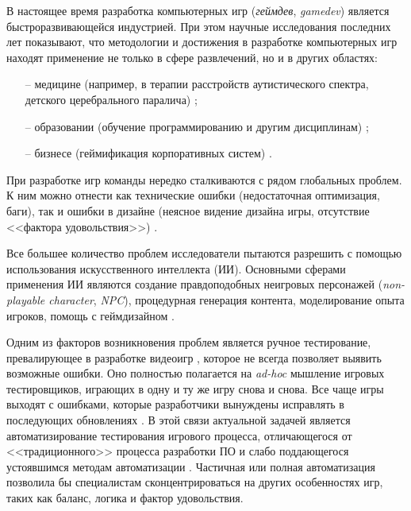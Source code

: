 
В настоящее время разработка компьютерных игр (\textit{геймдев}, \textit{gamedev}) является быстроразвивающейся индустрией. При этом научные исследования последних лет показывают, что методологии и достижения в разработке компьютерных игр находят применение не только в сфере развлечений, но и в других областях:
\begin{itemize}
	\item[--] медицине (например, в терапии расстройств аутистического спектра, детского церебрального паралича) \cite{lopes2018games,hassan2021serious};
	\item[--] образовании (обучение программированию и другим дисциплинам) \cite{vahldick2020blocks,mayer2019computer};
	\item[--] бизнесе (геймификация корпоративных систем) \cite{augustin2016we}.
\end{itemize}

При разработке игр команды нередко сталкиваются с рядом глобальных проблем. К ним можно отнести как технические ошибки (недостаточная оптимизация, баги), так и ошибки в дизайне (неясное видение дизайна игры, отсутствие <<фактора удовольствия>>) \cite{politowski2021game}.

Все большее количество проблем исследователи пытаются разрешить с помощью использования искусственного интеллекта (ИИ). Основными сферами применения ИИ являются создание правдоподобных неигровых персонажей (\textit{non-playable character}, \textit{NPC}), процедурная генерация контента, моделирование опыта игроков, помощь с геймдизайном \cite{xia2020recent}.

Одним из факторов возникновения проблем является ручное тестирование, превалирующее в разработке видеоигр \cite{santos2018computer}, которое не всегда позволяет выявить возможные ошибки. Оно полностью полагается на \textit{ad-hoc} мышление игровых тестировщиков, играющих в одну и ту же игру снова и снова. Все чаще игры выходят с ошибками, которые разработчики вынуждены исправлять в последующих обновлениях \cite{truelove2021we}. В этой связи актуальной задачей является автоматизирование тестирования игрового процесса, отличающегося от <<традиционного>> процесса разработки ПО и слабо поддающегося устоявшимся методам автоматизации \cite{politowski2021game,murphy2014cowboys}. Частичная или полная автоматизация позволила бы специалистам сконцентрироваться на других особенностях игр, таких как баланс, логика и фактор удовольствия.

